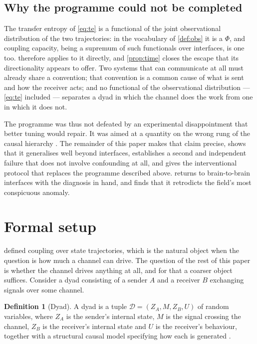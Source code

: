 \documentclass[11pt,a4paper]{article}
\theoremstyle{plain}
\theoremstyle{definition}
\newtheorem{definition}[definition]{Definition}
\theoremstyle{remark}
\newcommand{\Dy}{\mathcal{D}}
\begin{document}
\subsection{Why the programme could not be completed}\label{sec:pivot}

The transfer entropy of \eqref{eq:te} is a functional of the joint observational distribution
of the two trajectories: in the vocabulary of \cref{def:obs} it is a $\Phi$, and coupling
capacity, being a supremum of such functionals over interfaces, is one too. 
therefore applies to it directly, and \cref{prop:time} closes the escape that its directionality
appears to offer. Two systems that can communicate at all must already share a convention; that
convention is a common cause of what is sent and how the receiver acts; and no functional of the
observational distribution --- \eqref{eq:te} included --- separates a dyad in which the channel
does the work from one in which it does not.

The programme was thus not defeated by an experimental disappointment that better tuning would
repair. It was aimed at a quantity on the wrong rung of the causal hierarchy
\citep{pearl2009causality}. The remainder of this paper makes that claim precise, shows that it
generalises well beyond interfaces, establishes a second and independent failure that does not
involve confounding at all, and gives the interventional protocol that replaces the programme
described above.  returns to brain-to-brain interfaces with the diagnosis in hand,
and finds that it retrodicts the field's most conspicuous anomaly.

\section{Formal setup}\label{sec:setup}

 defined coupling over state trajectories, which is the natural object when
the question is how much a channel can drive. The question of the rest of this paper is whether
the channel drives anything at all, and for that a coarser object suffices. Consider a dyad
consisting of a sender $A$ and a receiver $B$ exchanging signals over some channel.

\begin{definition}[Dyad]\label{def:dyad}
A dyad is a tuple $\Dy = (Z_A, M, Z_B, U)$ of random variables, where $Z_A$ is the sender's
internal state, $M$ is the signal crossing the channel, $Z_B$ is the receiver's internal
state and $U$ is the receiver's behaviour, together with a structural causal model
specifying how each is generated \citep{pearl2009causality}.
\end{definition}
\end{document}
